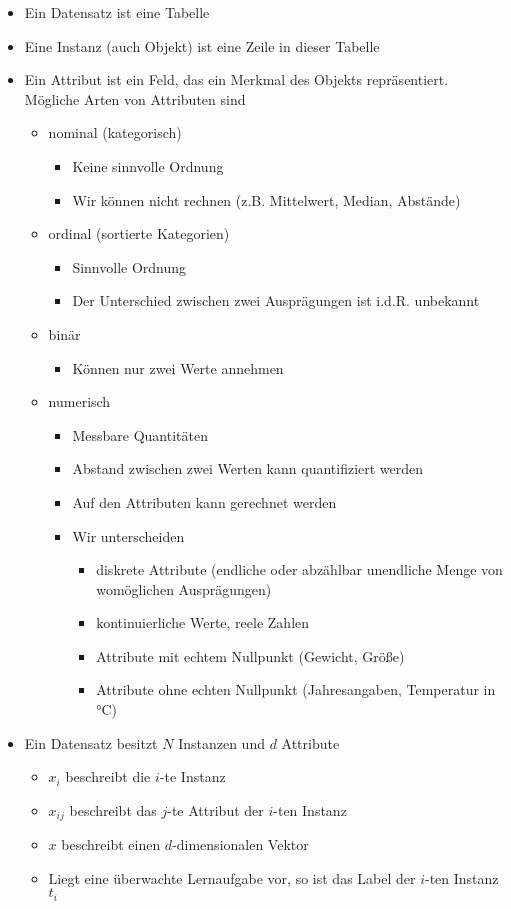 \documentclass{scrartcl}
\begin{document}
\begin{itemize}
	\item Ein Datensatz ist eine Tabelle
	\item Eine Instanz (auch Objekt) ist eine Zeile in dieser Tabelle
	\item Ein Attribut ist ein Feld, das ein Merkmal des Objekts repräsentiert. 
	Mögliche Arten von Attributen sind
	\begin{itemize}
		\item nominal (kategorisch)
		\begin{itemize}
			\item Keine sinnvolle Ordnung
			\item Wir können nicht rechnen (z.B. Mittelwert, Median, Abstände)
		\end{itemize}
		\item ordinal (sortierte Kategorien)
		\begin{itemize}
			\item Sinnvolle Ordnung
			\item Der Unterschied zwischen zwei Ausprägungen ist i.d.R. 
			unbekannt
		\end{itemize}
		\item binär
		\begin{itemize}
			\item Können nur zwei Werte annehmen
		\end{itemize}
		\item numerisch
		\begin{itemize}
			\item Messbare Quantitäten
			\item Abstand zwischen zwei Werten kann quantifiziert werden
			\item Auf den Attributen kann gerechnet werden
			\item Wir unterscheiden
			\begin{itemize}
				\item diskrete Attribute (endliche oder abzählbar unendliche 
				Menge von womöglichen Ausprägungen)
				\item kontinuierliche Werte, reele Zahlen
				\item Attribute mit echtem Nullpunkt (Gewicht, Größe)
				\item Attribute ohne echten Nullpunkt (Jahresangaben, 
				Temperatur in °C)
			\end{itemize}
		\end{itemize}
	\end{itemize}
	\item Ein Datensatz besitzt $ N $ Instanzen und $ d $ Attribute
	\begin{itemize}
		\item $ x_i $ beschreibt die $ i $-te Instanz
		\item $ x_{ij} $ beschreibt das $ j $-te Attribut der $ i $-ten Instanz
		\item $ x $ beschreibt einen $ d $-dimensionalen Vektor
		\item Liegt eine überwachte Lernaufgabe vor, so ist das Label der $ i 
		$-ten Instanz $ t_i $
	\end{itemize}
\end{itemize}
\end{document}
